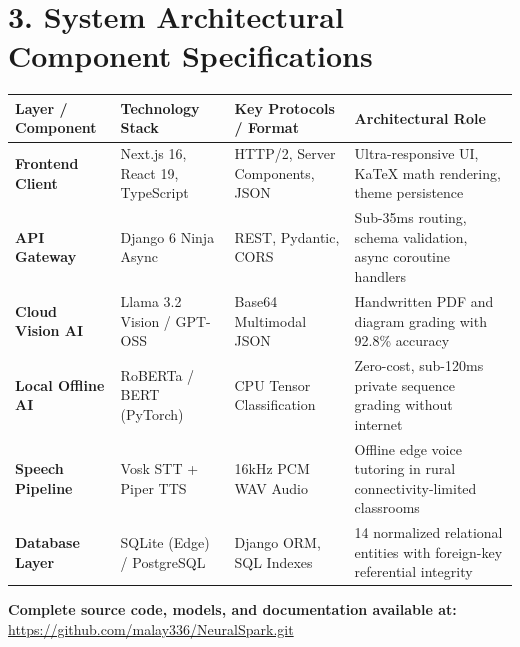 \documentclass[11pt,a4paper]{article}
\begin{document}
\vspace{0.4cm}
\section{3. System Architectural Component Specifications}

\begin{center}
\small
\begin{tabularx}{\textwidth}{p{3.2cm} p{3.8cm} p{3.8cm} X}
\toprule
\textbf{Layer / Component} & \textbf{Technology Stack} & \textbf{Key Protocols / Format} & \textbf{Architectural Role} \\
\midrule
\textbf{Frontend Client} & Next.js 16, React 19, TypeScript & HTTP/2, Server Components, JSON & Ultra-responsive UI, KaTeX math rendering, theme persistence \\
\textbf{API Gateway} & Django 6 Ninja Async & REST, Pydantic, CORS & Sub-35ms routing, schema validation, async coroutine handlers \\
\textbf{Cloud Vision AI} & Llama 3.2 Vision / GPT-OSS & Base64 Multimodal JSON & Handwritten PDF and diagram grading with 92.8\% accuracy \\
\textbf{Local Offline AI} & RoBERTa / BERT (PyTorch) & CPU Tensor Classification & Zero-cost, sub-120ms private sequence grading without internet \\
\textbf{Speech Pipeline} & Vosk STT + Piper TTS & 16kHz PCM WAV Audio & Offline edge voice tutoring in rural connectivity-limited classrooms \\
\textbf{Database Layer} & SQLite (Edge) / PostgreSQL & Django ORM, SQL Indexes & 14 normalized relational entities with foreign-key referential integrity \\
\bottomrule
\end{tabularx}
\end{center}

\vspace{0.3cm}
\begin{center}
\small\textbf{Complete source code, models, and documentation available at:}\\
\url{https://github.com/malay336/NeuralSpark.git}
\end{center}
\end{document}
